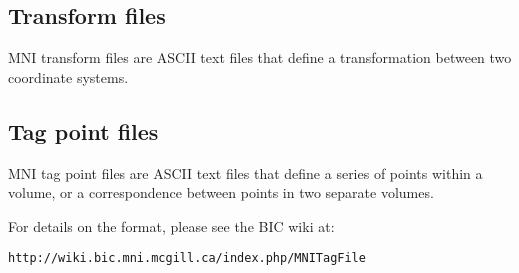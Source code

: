 \documentclass{article}
\begin{document}
\subsection{Transform files}

MNI transform files are ASCII text files that define a transformation
between two coordinate systems.

\subsection{Tag point files}

MNI tag point files are ASCII text files that define a series of points
within a volume, or a correspondence between points in two separate
volumes.

For details on the format, please see the BIC wiki at:

{\tt http://wiki.bic.mni.mcgill.ca/index.php/MNITagFile}
\end{document}

